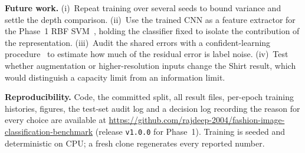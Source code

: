 \documentclass[conference]{IEEEtran}
\begin{document}
\textbf{Future work.} (i)~Repeat training over several seeds to bound variance and settle the depth comparison.
(ii)~Use the trained CNN as a feature extractor for the Phase~1 RBF SVM~\cite{razavian2014cnn}, holding the classifier
fixed to isolate the contribution of the representation. (iii)~Audit the shared errors with a confident-learning
procedure~\cite{northcutt2021pervasive} to estimate how much of the residual error is label noise. (iv)~Test whether
augmentation or higher-resolution inputs change the Shirt result, which would distinguish a capacity limit from an
information limit.

\textbf{Reproducibility.} Code, the committed split, all result files, per-epoch training histories, figures, the
test-set audit log and a decision log recording the reason for every choice are available at
\url{https://github.com/rajdeep-2004/fashion-image-classification-benchmark} (release \texttt{v1.0.0} for Phase~1).
Training is seeded and deterministic on CPU; a fresh clone regenerates every reported number.
\end{document}
